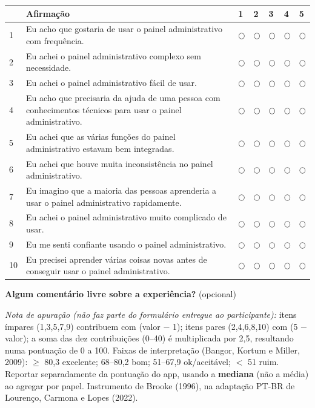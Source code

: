 \documentclass[11pt,a4paper]{article}
\begin{document}
\vspace{4mm}
\renewcommand{\arraystretch}{1.6}
\noindent\begin{tabular}{@{}p{0.6cm}p{8.2cm}p{1.0cm}p{1.0cm}p{1.0cm}p{1.0cm}p{1.0cm}@{}}
  \toprule
   & \textbf{Afirmação} & \textbf{1} & \textbf{2} & \textbf{3} & \textbf{4} & \textbf{5} \\
  \midrule
  1 & Eu acho que gostaria de usar o painel administrativo com frequência. & $\bigcirc$ & $\bigcirc$ & $\bigcirc$ & $\bigcirc$ & $\bigcirc$ \\
  2 & Eu achei o painel administrativo complexo sem necessidade. & $\bigcirc$ & $\bigcirc$ & $\bigcirc$ & $\bigcirc$ & $\bigcirc$ \\
  3 & Eu achei o painel administrativo fácil de usar. & $\bigcirc$ & $\bigcirc$ & $\bigcirc$ & $\bigcirc$ & $\bigcirc$ \\
  4 & Eu acho que precisaria da ajuda de uma pessoa com conhecimentos técnicos para usar o painel administrativo. & $\bigcirc$ & $\bigcirc$ & $\bigcirc$ & $\bigcirc$ & $\bigcirc$ \\
  5 & Eu achei que as várias funções do painel administrativo estavam bem integradas. & $\bigcirc$ & $\bigcirc$ & $\bigcirc$ & $\bigcirc$ & $\bigcirc$ \\
  6 & Eu achei que houve muita inconsistência no painel administrativo. & $\bigcirc$ & $\bigcirc$ & $\bigcirc$ & $\bigcirc$ & $\bigcirc$ \\
  7 & Eu imagino que a maioria das pessoas aprenderia a usar o painel administrativo rapidamente. & $\bigcirc$ & $\bigcirc$ & $\bigcirc$ & $\bigcirc$ & $\bigcirc$ \\
  8 & Eu achei o painel administrativo muito complicado de usar. & $\bigcirc$ & $\bigcirc$ & $\bigcirc$ & $\bigcirc$ & $\bigcirc$ \\
  9 & Eu me senti confiante usando o painel administrativo. & $\bigcirc$ & $\bigcirc$ & $\bigcirc$ & $\bigcirc$ & $\bigcirc$ \\
  10 & Eu precisei aprender várias coisas novas antes de conseguir usar o painel administrativo. & $\bigcirc$ & $\bigcirc$ & $\bigcirc$ & $\bigcirc$ & $\bigcirc$ \\
  \bottomrule
\end{tabular}

\vspace{5mm}
\noindent\textbf{Algum comentário livre sobre a experiência?} (opcional)

\vspace{2mm}
\noindent\hrulefill

\vspace{2mm}
\noindent\hrulefill

\vfill
\noindent\footnotesize\textit{Nota de apuração (não faz parte do formulário entregue ao
participante):} itens ímpares (1,3,5,7,9) contribuem com (valor $-$ 1); itens pares (2,4,6,8,10)
com (5 $-$ valor); a soma das dez contribuições (0--40) é multiplicada por 2,5, resultando numa
pontuação de 0 a 100. Faixas de interpretação (Bangor, Kortum e Miller, 2009): $\geq$ 80,3
excelente; 68--80,2 bom; 51--67,9 ok/aceitável; $<$ 51 ruim. Reportar separadamente da pontuação do
app, usando a \textbf{mediana} (não a média) ao agregar por papel. Instrumento de Brooke (1996), na
adaptação PT-BR de Lourenço, Carmona e Lopes (2022).
\end{document}
